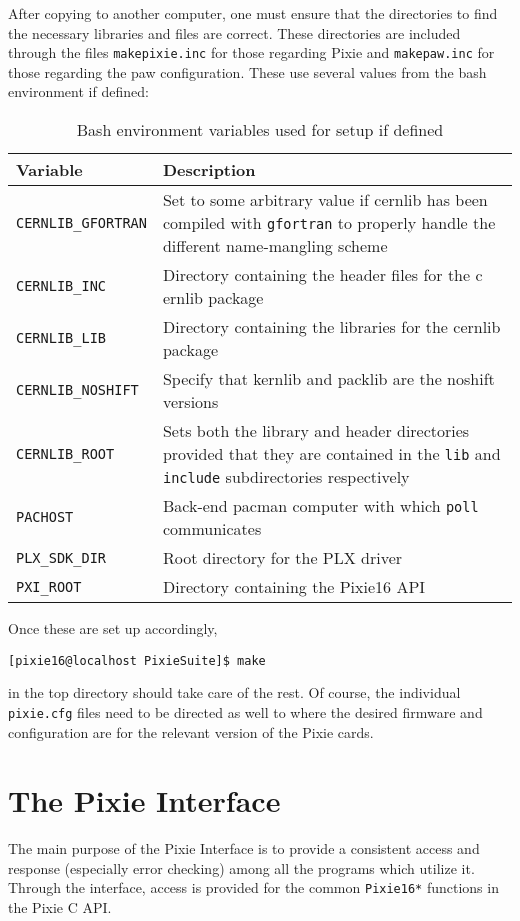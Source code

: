\documentclass[10pt]{article}
\begin{document}
After copying to another computer, one must ensure that the directories to
find the necessary libraries and files are correct. These directories are
included through the files \texttt{makepixie.inc} for those regarding Pixie
and \texttt{makepaw.inc} for those regarding the paw configuration. These use
several values from the bash environment if defined:
\begin{table}[ht]
\label{fig:bashenv}
\caption{Bash environment variables used for setup if defined}
\begin{tabular}{lp{3in}}
\hline
Variable & Description \\
\hline
\texttt{CERNLIB\_GFORTRAN} & Set to some arbitrary value if cernlib has been
compiled with \texttt{gfortran} to properly handle the different name-mangling
scheme \\
\texttt{CERNLIB\_INC}      & Directory containing the header files for the c
ernlib package \\
\texttt{CERNLIB\_LIB}      & Directory containing the libraries for the
cernlib package \\
\texttt{CERNLIB\_NOSHIFT}  & Specify that kernlib and packlib are the noshift
versions \\
\texttt{CERNLIB\_ROOT}     & Sets both the library and header directories 
provided that they are contained in the \texttt{lib} and \texttt{include}
subdirectories respectively \\
\texttt{PACHOST}           & Back-end pacman computer with which \texttt{poll}
communicates \\
\texttt{PLX\_SDK\_DIR}     & Root directory for the PLX driver \\
\texttt{PXI\_ROOT}         & Directory containing the Pixie16 API \\
\end{tabular}
\end{table}
Once these are set up accordingly,
\begin{verbatim}
[pixie16@localhost PixieSuite]$ make
\end{verbatim}
in the top directory should take care of the rest. Of course, the individual 
\texttt{pixie.cfg} files need to be directed as well to where the desired 
firmware and configuration are for the relevant version of the Pixie cards.
\section{\label{sec:pi}The Pixie Interface}
The main purpose of the Pixie Interface is to provide a consistent access and 
response (especially error checking) among all the programs which utilize it. 
Through the interface, access is provided for the common \texttt{Pixie16*} 
functions in the Pixie C API. 
\end{document}
